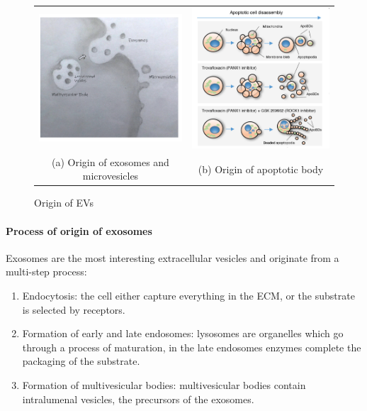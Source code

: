         \begin{figure}
            \begin{tabular}{cc}
                \includegraphics[width=65mm]{origin1} &   \includegraphics[width=65mm]{origin2} \\
                (a) Origin of exosomes and microvesicles & (b) Origin of apoptotic body \\[6pt]
            \end{tabular}
                \caption{Origin of EVs}
            \label{fig:origin}
        \end{figure}

            \paragraph{Process of origin of exosomes}
            Exosomes are the most interesting extracellular vesicles and originate from a multi-step process:

            \begin{multicols}{2}
                \begin{enumerate}
                    \item Endocytosis: the cell either capture everything in the ECM, or the substrate is selected by receptors.
                    \item Formation of early and late endosomes: lysosomes are organelles which go through a process of maturation, in the late endosomes enzymes complete the packaging of the substrate.
                    \item Formation of multivesicular bodies: multivesicular bodies contain intralumenal vesicles, the precursors of the exosomes.
                \end{enumerate}
            \end{multicols}

